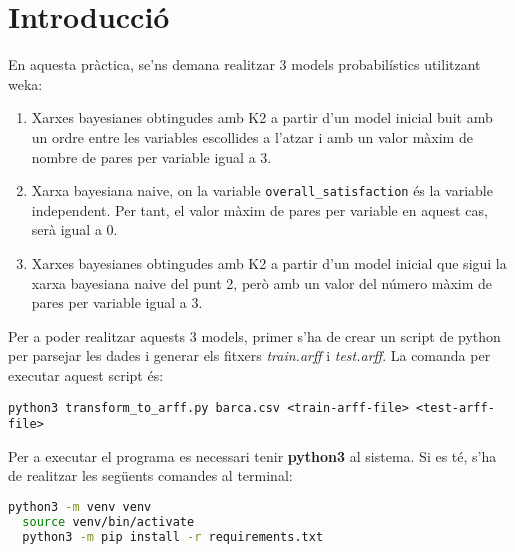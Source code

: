 \documentclass[../informe.tex]{subfiles}
\begin{document}
    \section{Introducció}
    En aquesta pràctica, se'ns demana realitzar 3 models probabilístics utilitzant weka:
    \begin{enumerate}
        \item Xarxes bayesianes obtingudes amb K2 a partir d'un model inicial buit amb un ordre entre les variables escollides a l'atzar i amb un valor màxim de nombre de pares per variable igual a 3.
        \item Xarxa bayesiana naive, on la variable \texttt{overall\_satisfaction} és la variable independent. Per tant, el valor màxim de pares per variable en aquest cas, serà igual a 0.
        \item Xarxes bayesianes obtingudes amb K2 a partir d'un model inicial que sigui la xarxa bayesiana naive del punt 2, però amb un valor del número màxim de pares per variable igual a 3.
    \end{enumerate}
    Per a poder realitzar aquests 3 models, primer s'ha de crear un script de python per parsejar les dades i generar els fitxers \emph{train.arff} i \emph{test.arff}. La comanda per executar aquest script és:
    \begin{Verbatim}[fontsize=\small]
   python3 transform_to_arff.py barca.csv <train-arff-file> <test-arff-file>
    \end{Verbatim}
    Per a executar el programa es necessari tenir \textbf{python3} al sistema. Si es té, s'ha de realitzar les següents comandes al terminal:
    \begin{lstlisting}[language=bash]
  python3 -m venv venv
  source venv/bin/activate
  python3 -m pip install -r requirements.txt
    \end{lstlisting}
\end{document}
